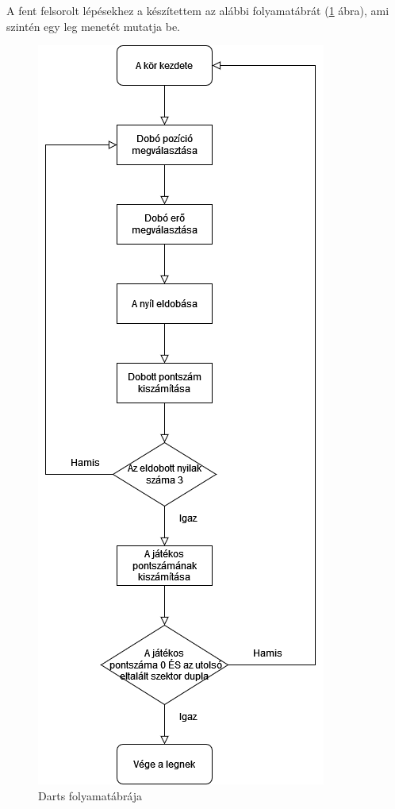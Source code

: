 A fent felsorolt lépésekhez a készítettem az alábbi folyamatábrát (\ref{fig:flowchart} ábra), ami szintén egy leg menetét mutatja be.

\begin{figure}[h]
\centering
\includegraphics[scale=0.7]{images/darts_flowchart.drawio}
\caption{Darts folyamatábrája}
\label{fig:flowchart}
\end{figure}